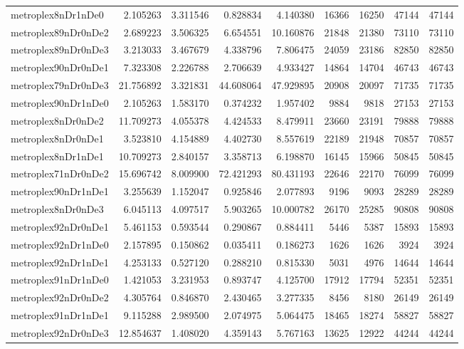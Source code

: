 \begin{longtable}{|l|r|r|r|r|r|r|r|r|}
metroplex8nDr1nDe0 & 2.105263 & 3.311546 & 0.828834 & 4.140380 & 16366 & 16250 & 47144 & 47144 \\
metroplex89nDr0nDe2 & 2.689223 & 3.506325 & 6.654551 & 10.160876 & 21848 & 21380 & 73110 & 73110 \\
metroplex89nDr0nDe3 & 3.213033 & 3.467679 & 4.338796 & 7.806475 & 24059 & 23186 & 82850 & 82850 \\
metroplex90nDr0nDe1 & 7.323308 & 2.226788 & 2.706639 & 4.933427 & 14864 & 14704 & 46743 & 46743 \\
metroplex79nDr0nDe3 & 21.756892 & 3.321831 & 44.608064 & 47.929895 & 20908 & 20097 & 71735 & 71735 \\
metroplex90nDr1nDe0 & 2.105263 & 1.583170 & 0.374232 & 1.957402 & 9884 & 9818 & 27153 & 27153 \\
metroplex8nDr0nDe2 & 11.709273 & 4.055378 & 4.424533 & 8.479911 & 23660 & 23191 & 79888 & 79888 \\
metroplex8nDr0nDe1 & 3.523810 & 4.154889 & 4.402730 & 8.557619 & 22189 & 21948 & 70857 & 70857 \\
metroplex8nDr1nDe1 & 10.709273 & 2.840157 & 3.358713 & 6.198870 & 16145 & 15966 & 50845 & 50845 \\
metroplex71nDr0nDe2 & 15.696742 & 8.009900 & 72.421293 & 80.431193 & 22646 & 22170 & 76099 & 76099 \\
metroplex90nDr1nDe1 & 3.255639 & 1.152047 & 0.925846 & 2.077893 & 9196 & 9093 & 28289 & 28289 \\
metroplex8nDr0nDe3 & 6.045113 & 4.097517 & 5.903265 & 10.000782 & 26170 & 25285 & 90808 & 90808 \\
metroplex92nDr0nDe1 & 5.461153 & 0.593544 & 0.290867 & 0.884411 & 5446 & 5387 & 15893 & 15893 \\
metroplex92nDr1nDe0 & 2.157895 & 0.150862 & 0.035411 & 0.186273 & 1626 & 1626 & 3924 & 3924 \\
metroplex92nDr1nDe1 & 4.253133 & 0.527120 & 0.288210 & 0.815330 & 5031 & 4976 & 14644 & 14644 \\
metroplex91nDr1nDe0 & 1.421053 & 3.231953 & 0.893747 & 4.125700 & 17912 & 17794 & 52351 & 52351 \\
metroplex92nDr0nDe2 & 4.305764 & 0.846870 & 2.430465 & 3.277335 & 8456 & 8180 & 26149 & 26149 \\
metroplex91nDr1nDe1 & 9.115288 & 2.989500 & 2.074975 & 5.064475 & 18465 & 18274 & 58827 & 58827 \\
metroplex92nDr0nDe3 & 12.854637 & 1.408020 & 4.359143 & 5.767163 & 13625 & 12922 & 44244 & 44244 \\

\end{longtable}

